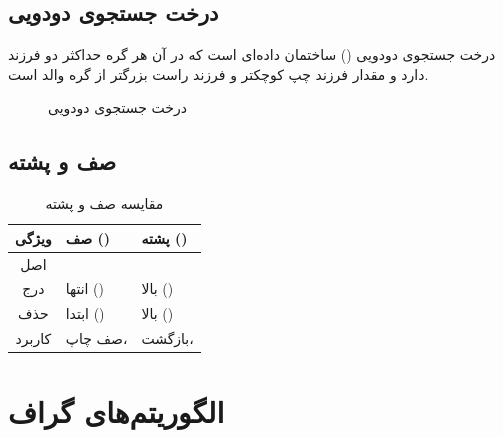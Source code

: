 \documentclass{matinbook}
\begin{document}
\section{درخت جستجوی دودویی}

درخت جستجوی دودویی
() ساختمان داده‌ای است که در آن
هر گره حداکثر دو فرزند دارد و مقدار
فرزند چپ کوچکتر و فرزند راست بزرگتر
از گره والد است.

\begin{figure}[h]
\centering
\begin{latin}
\end{latin}
\caption{درخت جستجوی دودویی}
\label{fig:bst}
\end{figure}

\section{صف و پشته}

\begin{table}[h]
\centering
\caption{مقایسه صف و پشته}
\label{tab:queue-stack}
\begin{tabular}{|c|C{4cm}|C{4cm}|}
\hline
\textbf{ویژگی} & \textbf{صف ()} & \textbf{پشته ()} \\
\hline
اصل &  &  \\
درج & انتها () & بالا () \\
حذف & ابتدا () & بالا () \\
کاربرد & صف چاپ،  & بازگشت،  \\
\hline
\end{tabular}
\end{table}

\chapter{الگوریتم‌های گراف}
\label{chap:graphs}
\end{document}
